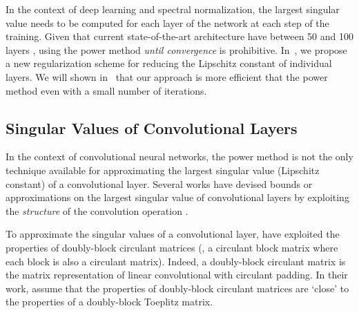 In the context of deep learning and spectral normalization, the largest singular value needs to be computed for each layer of the network at each step of the training. 
Given that current state-of-the-art architecture have between 50 and 100 layers \cite{he2016deep,tan2019efficientnet}, using the power method \emph{until convergence} is prohibitive.
In~, we propose a new regularization scheme for reducing the Lipschitz constant of individual layers.
We will shown in~ that our approach is more efficient that the power method even with a small number of iterations.



\subsection{Singular Values of Convolutional Layers}
\label{subsection:ch3-singular_values_of_convolutional_layers}

In the context of convolutional neural networks, the power method is not the only technique available for approximating the largest singular value (Lipschitz constant) of a convolutional layer.
Several works have devised bounds or approximations on the largest singular value of convolutional layers by exploiting the \emph{structure} of the convolution operation \cite{sedghi2018singular,bibi2019deep,singla2019bounding,jia2017improving}.

%


To approximate the singular values of a convolutional layer, \citet{sedghi2018singular} have exploited the properties of doubly-block circulant matrices (\ie, a circulant block matrix where each block is also a circulant matrix).
Indeed, a doubly-block circulant matrix is the matrix representation of linear convolutional with circulant padding.
In their work, \citet{sedghi2018singular} assume that the properties of doubly-block circulant matrices are `close' to the properties of a doubly-block Toeplitz matrix.

